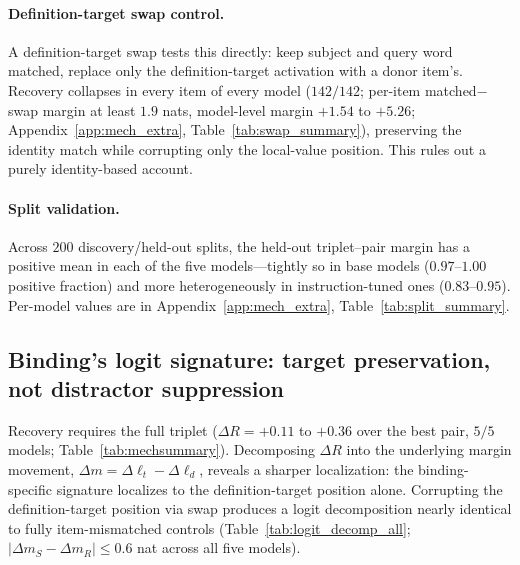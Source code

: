 \documentclass[11pt]{article}
\begin{document}
\paragraph{Definition-target swap control.}
A definition-target swap tests this directly: keep subject and query word matched, replace
only the definition-target activation with a donor item's. Recovery collapses in every item
of every model ($142/142$; per-item matched$-$swap margin at least $1.9$ nats, model-level
margin $+1.54$ to $+5.26$; Appendix~\ref{app:mech_extra}, Table~\ref{tab:swap_summary}),
preserving the identity match while corrupting only the local-value position. This rules
out a purely identity-based account.

\paragraph{Split validation.}
Across $200$ discovery/held-out splits, the held-out triplet--pair margin has a positive mean
in each of the five models---tightly so in base models ($0.97$--$1.00$ positive fraction) and
more heterogeneously in instruction-tuned ones ($0.83$--$0.95$). Per-model values are in
Appendix~\ref{app:mech_extra}, Table~\ref{tab:split_summary}.

\subsection{Binding's logit signature: target preservation, not distractor suppression}

Recovery requires the full triplet ($\Delta R = +0.11$ to $+0.36$ over the best pair, $5/5$
models; Table~\ref{tab:mechsummary}). Decomposing $\Delta R$ into the underlying margin
movement, $\Delta m = \Delta\ell_t - \Delta\ell_d$, reveals a sharper localization: the
binding-specific signature localizes to the definition-target position alone. Corrupting
the definition-target position via swap produces a logit decomposition nearly identical to fully
item-mismatched controls (Table~\ref{tab:logit_decomp_all}; $|\Delta m_S - \Delta m_R| \leq 0.6$
nat across all five models).
\end{document}
